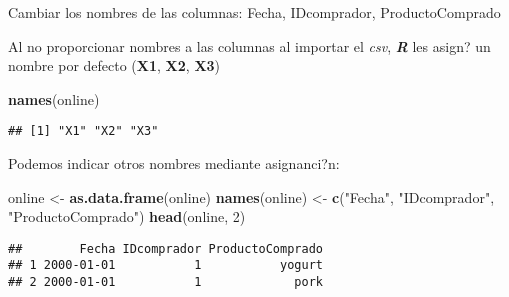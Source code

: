 \documentclass[
  ignorenonframetext,
]{beamer}
\newenvironment{Shaded}{\begin{snugshade}}{\end{snugshade}}
\newcommand{\DecValTok}[1]{\textcolor[rgb]{0.00,0.00,0.81}{#1}}
\newcommand{\KeywordTok}[1]{\textcolor[rgb]{0.13,0.29,0.53}{\textbf{#1}}}
\newcommand{\NormalTok}[1]{#1}
\newcommand{\StringTok}[1]{\textcolor[rgb]{0.31,0.60,0.02}{#1}}
\begin{document}
\begin{frame}[fragile]{Cambiar los nombres de las columnas: Fecha,
IDcomprador, ProductoComprado}
\protect\hypertarget{cambiar-los-nombres-de-las-columnas-fecha-idcomprador-productocomprado}{}

Al no proporcionar nombres a las columnas al importar el \emph{csv},
\textbf{\emph{R}} les asign? un nombre por defecto (\textbf{X1},
\textbf{X2}, \textbf{X3})

\begin{Shaded}
\begin{Highlighting}[]
\KeywordTok{names}\NormalTok{(online)}
\end{Highlighting}
\end{Shaded}

\begin{verbatim}
## [1] "X1" "X2" "X3"
\end{verbatim}

Podemos indicar otros nombres mediante asignanci?n:

\begin{Shaded}
\begin{Highlighting}[]
\NormalTok{online <-}\StringTok{ }\KeywordTok{as.data.frame}\NormalTok{(online)}
\KeywordTok{names}\NormalTok{(online) <-}\StringTok{ }\KeywordTok{c}\NormalTok{(}\StringTok{"Fecha"}\NormalTok{, }\StringTok{"IDcomprador"}\NormalTok{, }\StringTok{"ProductoComprado"}\NormalTok{)}
\KeywordTok{head}\NormalTok{(online, }\DecValTok{2}\NormalTok{)}
\end{Highlighting}
\end{Shaded}

\begin{verbatim}
##        Fecha IDcomprador ProductoComprado
## 1 2000-01-01           1           yogurt
## 2 2000-01-01           1             pork
\end{verbatim}

\end{frame}
\end{document}

